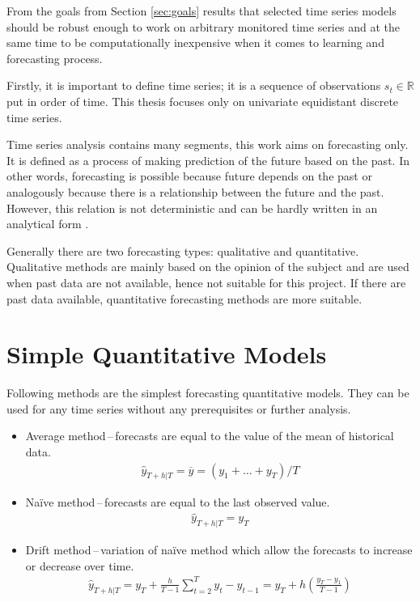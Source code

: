 From the goals from Section \ref{sec:goals} results that selected time series models should be robust enough to work on
arbitrary monitored time series and at the same time to be computationally inexpensive when it comes to learning and
forecasting process.

Firstly, it is important to define time series; it is a sequence of observations $s_t \in \mathbb{R}$ put in order of
time. This thesis focuses only on univariate equidistant discrete time series.

Time series analysis contains many segments, this work aims on forecasting only. It is defined as a process of making
prediction of the future based on the past. In other words, forecasting is possible because future depends on the
past or analogously because there is a relationship between the future and the past. However, this relation is not
deterministic and can be hardly written in an analytical form \cite{otexts}.

Generally there are two forecasting types: qualitative and quantitative. Qualitative methods are mainly based on the
opinion of the subject and are used when past data are not available, hence not suitable for this project. If there
are past data available, quantitative forecasting methods are more suitable.

    \section{Simple Quantitative Models} \label{sec:simple-models}
    Following methods are the simplest forecasting quantitative models. They can be used for any time series without
    any prerequisites or further analysis.

    \begin{itemize}
        \item Average method\,--\,forecasts are equal to the value of the mean of historical data.
            \begin{eqnarray}
                \hat{y}_{T+h|T} = \overline{y} = (y_{1}+ \dots + y_{T}) / T 
            \end{eqnarray}
        \item Na\"{i}ve method\,--\,forecasts are equal to the last observed value.
            \begin{eqnarray}
                \hat{y}_{T+h|T} = y_{T}
            \end{eqnarray}
        \item Drift method\,--\,variation of na\"{i}ve method which allow the forecasts to increase or decrease
            over time.
            \begin{eqnarray}
                \hat{y}_{T+h|T} = y_{T} + \frac{h}{T-1} \sum_{t=2}^T{y_{t} - y_{t-1}} = 
                    y_{T} + h(\frac{y_{T}-y_{1}}{T-1}) 
            \end{eqnarray}
    \end{itemize}

